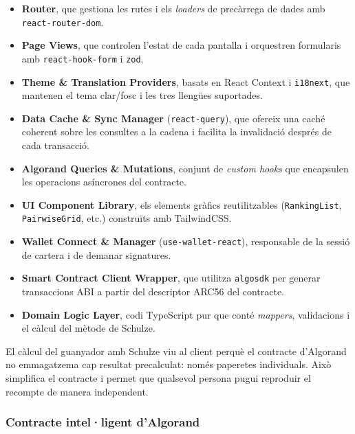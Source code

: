 \begin{itemize}
    \item \textbf{Router}, que gestiona les rutes i els \textit{loaders} de precàrrega de dades amb
    \texttt{react-router-dom}.

    \item \textbf{Page Views}, que controlen l'estat de cada pantalla i orquestren formularis amb
    \texttt{react-hook-form} i \texttt{zod}.

    \item \textbf{Theme \& Translation Providers}, basats en React Context i \texttt{i18next}, que mantenen el tema
    clar/fosc i les tres llengües suportades.

    \item \textbf{Data Cache \& Sync Manager} (\texttt{react-query}), que ofereix una caché coherent sobre les consultes
    a la cadena i facilita la invalidació després de cada transacció.

    \item \textbf{Algorand Queries \& Mutations}, conjunt de \textit{custom hooks} que encapsulen les operacions
    asíncrones del contracte.

    \item \textbf{UI Component Library}, els elements gràfics reutilitzables (\texttt{RankingList},
    \texttt{PairwiseGrid}, etc.) construïts amb TailwindCSS\@.

    \item \textbf{Wallet Connect \& Manager} (\texttt{use-wallet-react}), responsable de la sessió de cartera i de
    demanar signatures.

    \item \textbf{Smart Contract Client Wrapper}, que utilitza \texttt{algosdk} per generar transaccions \ac{ABI} a
    partir del descriptor \ac{ARC}56 del contracte.

    \item \textbf{Domain Logic Layer}, codi TypeScript pur que conté \textit{mappers}, validacions i el càlcul del
    mètode de Schulze.
\end{itemize}

El càlcul del guanyador amb Schulze viu al client perquè el contracte d'Algorand no emmagatzema cap resultat
precalculat: només paperetes individuals.
Això simplifica el contracte i permet que qualsevol persona pugui reproduir el recompte de manera independent.

\subsubsection{Contracte intel·ligent d'Algorand}

